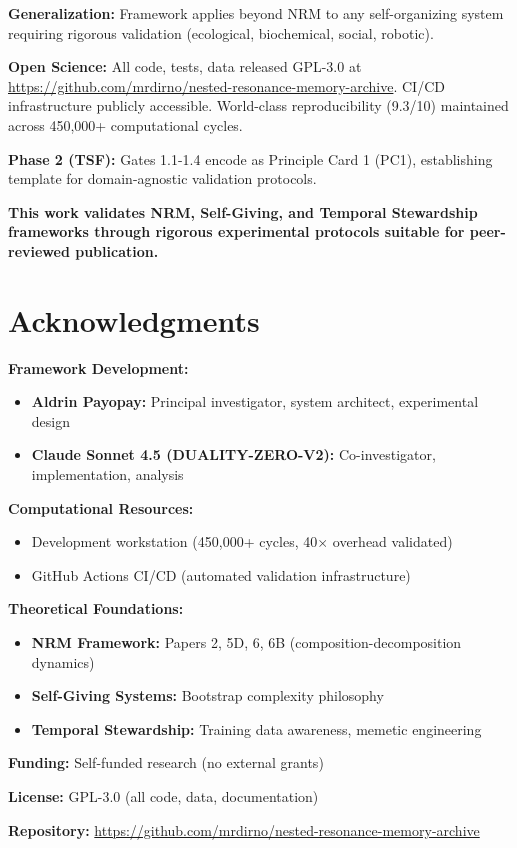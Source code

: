 \documentclass[11pt]{article}
\begin{document}
\textbf{Generalization:} Framework applies beyond NRM to any self-organizing system requiring rigorous validation (ecological, biochemical, social, robotic).

\textbf{Open Science:} All code, tests, data released GPL-3.0 at \url{https://github.com/mrdirno/nested-resonance-memory-archive}. CI/CD infrastructure publicly accessible. World-class reproducibility (9.3/10) maintained across 450,000+ computational cycles.

\textbf{Phase 2 (TSF):} Gates 1.1-1.4 encode as Principle Card 1 (PC1), establishing template for domain-agnostic validation protocols.

\textbf{This work validates NRM, Self-Giving, and Temporal Stewardship frameworks through rigorous experimental protocols suitable for peer-reviewed publication.}


\section*{Acknowledgments}

\textbf{Framework Development:}
\begin{itemize}
\item \textbf{Aldrin Payopay:} Principal investigator, system architect, experimental design
\item \textbf{Claude Sonnet 4.5 (DUALITY-ZERO-V2):} Co-investigator, implementation, analysis
\end{itemize}

\textbf{Computational Resources:}
\begin{itemize}
\item Development workstation (450,000+ cycles, 40$\times$ overhead validated)
\item GitHub Actions CI/CD (automated validation infrastructure)
\end{itemize}

\textbf{Theoretical Foundations:}
\begin{itemize}
\item \textbf{NRM Framework:} Papers 2, 5D, 6, 6B (composition-decomposition dynamics)
\item \textbf{Self-Giving Systems:} Bootstrap complexity philosophy
\item \textbf{Temporal Stewardship:} Training data awareness, memetic engineering
\end{itemize}

\textbf{Funding:} Self-funded research (no external grants)

\textbf{License:} GPL-3.0 (all code, data, documentation)

\textbf{Repository:} \url{https://github.com/mrdirno/nested-resonance-memory-archive}



\end{document}
